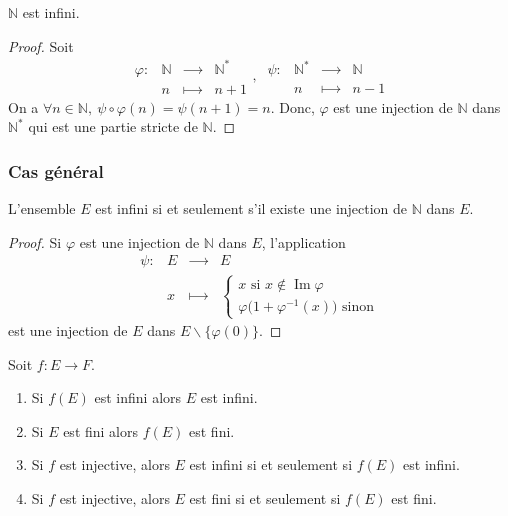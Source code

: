 %
\begin{theorem}
\(ℕ\) est infini.
\end{theorem}
\begin{proof}
Soit
\begin{equation*}
\begin{matrix}
𝜑:&ℕ&⟶&ℕ^{\ast }
\\
&𝑛&⟼&𝑛+1
\end{matrix},\ \begin{matrix}
𝜓:&ℕ^{\ast
}&⟶&ℕ
\\
&𝑛&⟼&𝑛-1
\end{matrix}
\end{equation*}
On a \(∀𝑛∈ℕ,\ 𝜓∘𝜑(𝑛)=𝜓(𝑛+1)=𝑛\).
Donc, \(𝜑\) est une injection de \(ℕ\) dans \(ℕ^{\ast }\) qui est une partie stricte de \(ℕ\).
\end{proof}
%
\subsubsection[Cas général]{Cas général}
\begin{theorem}
\label{seq:refTheorem7}
L'ensemble \(𝐸\) est infini si et seulement s'il existe une injection de \(ℕ\) dans \(𝐸\).
\end{theorem}
\begin{proof}
Si \(𝜑\) est une injection de \(ℕ\) dans \(𝐸\), l'application
\begin{equation*}
\begin{matrix}
𝜓:&𝐸&⟶&𝐸
\\
&𝑥&⟼&\begin{cases}
𝑥\text{ si }𝑥∉\operatorname{Im}𝜑
\\
𝜑\bigl(1+𝜑^{-1}(𝑥)\bigr)\text{ sinon}
\end{cases}
\end{matrix}
\end{equation*}
est une injection de \(𝐸\) dans \(𝐸∖\{𝜑(0)\}\).
\end{proof}
%
%
\begin{theorem}
Soit \(𝑓:𝛦→𝐹\).
\begin{enumerate}
\item Si \(𝑓(𝛦)\) est infini alors \(𝐸\) est infini.
\item Si \(𝐸\) est fini alors \(𝑓(𝛦)\) est fini.
\item Si \(𝑓\) est injective, alors \(𝛦\) est infini si et seulement si \(𝑓(𝛦)\) est infini.
\item Si \(𝑓\) est injective, alors \(𝛦\) est fini si et seulement si \(𝑓(𝛦)\) est fini.
\end{enumerate}
\end{theorem}
